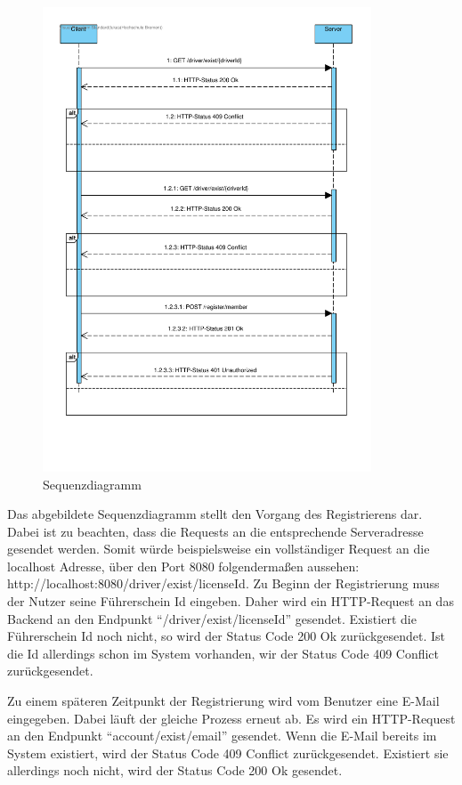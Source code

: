 \begin{figure}[H]
    \centering
    \includegraphics[width = 0.87\textwidth]{pictures/fastlane_sequenz_diagramm}
    \caption{Sequenzdiagramm}
    \label{fig:sequenzdiagramm}
\end{figure}

Das abgebildete Sequenzdiagramm stellt den Vorgang des Registrierens dar.
Dabei ist zu beachten, dass die Requests an die entsprechende Serveradresse gesendet werden.
Somit würde beispielsweise ein vollständiger Request an die localhost Adresse, über den Port 8080 folgendermaßen
aussehen: http://localhost:8080/driver/exist/licenseId.
Zu Beginn der Registrierung muss der Nutzer seine Führerschein Id eingeben.
Daher wird ein HTTP-Request an das Backend an den Endpunkt \enquote{/driver/exist/licenseId} gesendet.
Existiert die Führerschein Id noch nicht, so wird der Status Code 200 Ok zurückgesendet.
Ist die Id allerdings schon im System vorhanden, wir der Status Code 409 Conflict
zurückgesendet. \medskip

Zu einem späteren Zeitpunkt der Registrierung wird vom Benutzer eine E-Mail eingegeben.
Dabei läuft der gleiche Prozess erneut ab.
Es wird ein HTTP-Request an den Endpunkt \enquote{account/exist/email} gesendet.
Wenn die E-Mail bereits im System existiert, wird der Status Code 409 Conflict zurückgesendet.
Existiert sie allerdings noch nicht, wird der Status Code 200 Ok gesendet. \medskip

